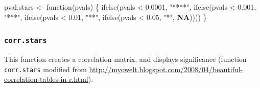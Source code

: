 \documentclass[
  bookmarksnumbered]{article}
\newenvironment{Shaded}{\begin{snugshade}}{\end{snugshade}}
\newcommand{\ConstantTok}[1]{\textcolor[rgb]{0.86,0.64,0.64}{\textbf{#1}}}
\newcommand{\ControlFlowTok}[1]{\textcolor[rgb]{0.94,0.87,0.69}{#1}}
\newcommand{\FloatTok}[1]{\textcolor[rgb]{0.75,0.75,0.82}{#1}}
\newcommand{\FunctionTok}[1]{\textcolor[rgb]{0.94,0.94,0.56}{#1}}
\newcommand{\NormalTok}[1]{\textcolor[rgb]{0.80,0.80,0.80}{#1}}
\newcommand{\OtherTok}[1]{\textcolor[rgb]{0.94,0.94,0.56}{#1}}
\newcommand{\SpecialCharTok}[1]{\textcolor[rgb]{0.86,0.64,0.64}{#1}}
\newcommand{\StringTok}[1]{\textcolor[rgb]{0.80,0.58,0.58}{#1}}
\begin{document}
\begin{Shaded}
\begin{Highlighting}[]
\NormalTok{pval.stars }\OtherTok{\textless{}{-}} \ControlFlowTok{function}\NormalTok{(pvals) \{}
  \FunctionTok{ifelse}\NormalTok{(pvals }\SpecialCharTok{\textless{}} \FloatTok{0.0001}\NormalTok{, }\StringTok{"****"}\NormalTok{,}
         \FunctionTok{ifelse}\NormalTok{(pvals }\SpecialCharTok{\textless{}} \FloatTok{0.001}\NormalTok{, }\StringTok{"***"}\NormalTok{,}
                \FunctionTok{ifelse}\NormalTok{(pvals }\SpecialCharTok{\textless{}} \FloatTok{0.01}\NormalTok{, }\StringTok{"**"}\NormalTok{,}
                       \FunctionTok{ifelse}\NormalTok{(pvals }\SpecialCharTok{\textless{}} \FloatTok{0.05}\NormalTok{, }\StringTok{"*"}\NormalTok{, }\ConstantTok{NA}\NormalTok{))))}
\NormalTok{\}}
\end{Highlighting}
\end{Shaded}

\subsubsection{\texorpdfstring{\texttt{corr.stars}}{corr.stars}}\label{corr.stars}

This function creates a correlation matrix, and displays significance (function \texttt{corr.stars} modified from \url{http://myowelt.blogspot.com/2008/04/beautiful-correlation-tables-in-r.html}).
\end{document}
